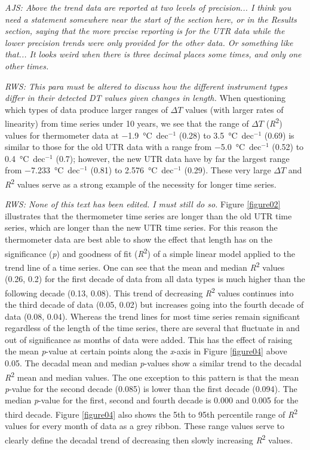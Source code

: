 \documentclass{ametsoc}
\begin{document}
\emph{AJS: Above the trend data are reported at two levels of precision... I think you need a statement somewhere near the start of the section here, or in the Results section, saying that the more precise reporting is for the UTR data while the lower precision trends were only provided for the other data. Or something like that... It looks weird when there is three decimal places some times, and only one other times.}

\emph{RWS: This para must be altered to discuss how the different instrument types differ in their detected DT values given changes in length.}
When questioning which types of data produce larger ranges of $\Delta T$ values (with larger rates of linearity) from time series under 10 years, we see that the range of $\Delta T$ (\emph{R}\textsuperscript{2}) values for thermometer data at \SI{-1.9}{\degreeCelsius}~dec$^{-1}$ (0.28) to \SI{3.5}{\degreeCelsius}~dec$^{-1}$ (0.69) is similar to those for the old UTR data with a range from \SI{-5.0}{\degreeCelsius}~dec$^{-1}$ (0.52) to \SI{0.4}{\degreeCelsius}~dec$^{-1}$ (0.7); however, the new UTR data have by far the largest range from \SI{-7.233}{\degreeCelsius}~dec$^{-1}$ (0.81) to \SI{2.576}{\degreeCelsius}~dec$^{-1}$ (0.29). These very large $\Delta T$ and \emph{R}\textsuperscript{2} values serve as a strong example of the necessity for longer time series.




\emph{RWS: None of this text has been edited. I must still do so.}
Figure \ref{figure02} illustrates that the thermometer time series are longer than the old UTR time series, which are longer than the new UTR time series. For this reason the thermometer data are best able to show the effect that length has on the significance (\emph{p}) and goodness of fit (\emph{R}\textsuperscript{2}) of a simple linear model applied to the trend line of a time series. One can see that the mean and median \emph{R}\textsuperscript{2} values (0.26, 0.2) for the first decade of data from all data types is much higher than the following decade (0.13, 0.08). This trend of decreasing \emph{R}\textsuperscript{2} values continues into the third decade of data (0.05, 0.02) but increases going into the fourth decade of data (0.08, 0.04). Whereas the trend lines for most time series remain significant regardless of the length of the time series, there are several that fluctuate in and out of significance as months of data were added. This has the effect of raising the mean \emph{p}-value at certain points along the \emph{x}-axis in Figure \ref{figure04} above 0.05. The decadal mean and median \emph{p}-values show a similar trend to the decadal \emph{R}\textsuperscript{2} mean and median values. The one exception to this pattern is that the mean \emph{p}-value for the second decade (0.085) is lower than the first decade (0.094). The median \emph{p}-value for the first, second and fourth decade is 0.000 and 0.005 for the third decade. Figure \ref{figure04} also shows the 5th to 95th percentile range of \emph{R}\textsuperscript{2} values for every month of data as a grey ribbon. These range values serve to clearly define the decadal trend of decreasing then slowly increasing \emph{R}\textsuperscript{2} values.
\end{document}
